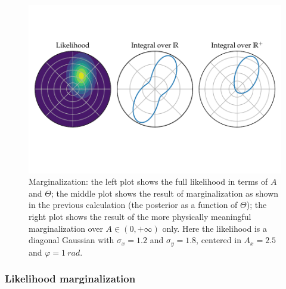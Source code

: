 \documentclass[main.tex]{subfiles}
\begin{document}
\begin{figure}[ht]
\centering
\includegraphics[width=\textwidth]{figures/marginalization.pdf}
\caption{Marginalization: the left plot shows the full likelihood in terms of \(A\) and \(\Theta \); the middle plot shows the result of marginalization as shown in the previous calculation (the posterior as a function of \(\Theta \)); the right plot shows the result of the more physically meaningful marginalization over \(A \in (0, + \infty )\) only.
Here the likelihood is a diagonal Gaussian with \(\sigma _x = \num{1.2}\) and \(\sigma _y = \num{1.8}\), centered in \(A_x = \num{2.5}\) and \(\varphi = \SI{1}{rad}\).}
\label{fig:marginalization}
\end{figure}

\subsubsection{Likelihood marginalization}
\end{document}
